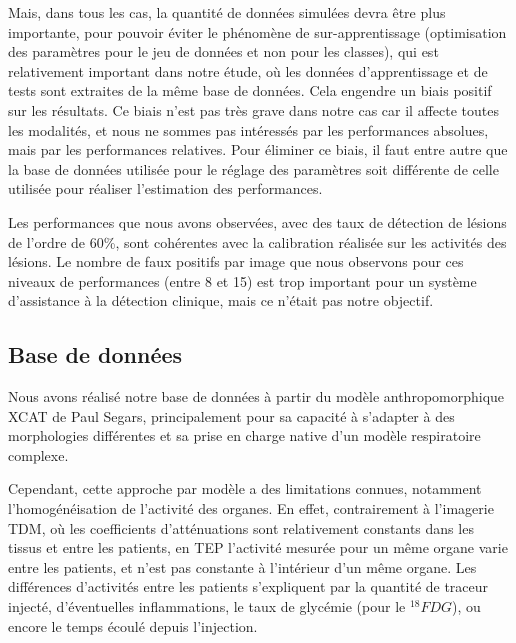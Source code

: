 Mais, dans tous les cas, la quantité de données simulées devra être plus
importante, pour pouvoir éviter le phénomène de sur-apprentissage (optimisation
des paramètres pour le jeu de données et non pour les classes), qui est
relativement important dans notre étude, où les données d'apprentissage et
de tests sont extraites de la même base de données. Cela engendre un biais
positif sur les résultats. Ce biais n'est pas très grave dans notre cas car
il affecte toutes les modalités, et nous ne sommes pas intéressés par les
performances absolues, mais par les performances relatives.
Pour éliminer ce biais, il faut entre autre que la base de données utilisée
pour le réglage des paramètres soit différente de celle utilisée pour réaliser
l'estimation des performances.

Les performances que nous avons observées, avec des taux de détection de lésions
de l'ordre de 60\%, sont cohérentes avec la calibration réalisée sur les
activités des lésions. Le nombre de faux positifs par image que nous observons
pour ces niveaux de performances (entre 8 et 15) est trop important pour un
système d'assistance à la détection clinique, mais ce n'était pas notre
objectif.
 

\subsection{Base de données}

Nous avons réalisé notre base de données à partir du modèle anthropomorphique
XCAT de Paul Segars, principalement pour sa capacité à s'adapter à des
morphologies différentes et sa prise en charge native d'un modèle respiratoire
complexe. 

Cependant, cette approche par modèle a des limitations connues, notamment
l'homogénéisation de l'activité des organes. En effet, contrairement à
l'imagerie TDM, où les coefficients d'atténuations sont relativement constants
dans les tissus et entre les patients, en TEP l'activité mesurée pour un même
organe varie entre les patients, et n'est pas constante à l'intérieur d'un même
organe. Les différences d'activités entre les patients s'expliquent par la
quantité de traceur injecté, d'éventuelles inflammations, le taux de glycémie
(pour le $^{18}FDG$), ou encore le temps écoulé depuis l'injection.  

